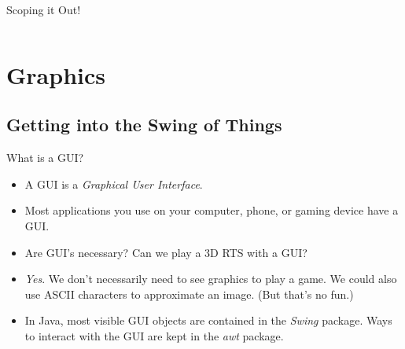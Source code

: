 \begin{frame}[fragile]{Scoping it Out!}
\begin{columns}[onlytextwidth]
    \begin{column}{0.5\textwidth}
\begin{semiverbatim}\end{semiverbatim}
    \end{column}
    \begin{column}{0.5\textwidth}
\begin{semiverbatim}\end{semiverbatim}
    \end{column}
\end{columns}
\end{frame}

\section{Graphics}
\subsection{Getting into the Swing of Things}
\begin{frame}{What is a GUI?}
\begin{itemize}
\item A GUI is a \emph{Graphical User Interface}.\pause
\item Most applications you use on your computer, phone, or gaming device have a GUI.
\item Are GUI's necessary? Can we play a 3D RTS with a GUI? \pause
\item \emph{Yes}. We don't necessarily need to see graphics to play a game. We could also use ASCII characters to approximate an image. (But that's no fun.)\pause
\item In Java, most visible GUI objects are contained in the \emph{Swing} package. Ways to interact with the GUI are kept in the \emph{awt} package.
\end{itemize}
\end{frame}

